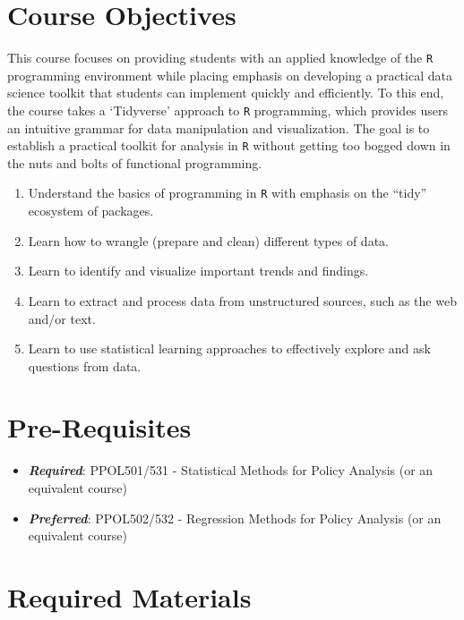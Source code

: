 \documentclass[
  12pt,
]{article}
\providecommand{\tightlist}{%
  \setlength{\itemsep}{0pt}\setlength{\parskip}{0pt}}
\begin{document}
\hypertarget{course-objectives}{%
\section{Course Objectives}\label{course-objectives}}

This course focuses on providing students with an applied knowledge of
the \texttt{R} programming environment while placing emphasis on
developing a practical data science toolkit that students can implement
quickly and efficiently. To this end, the course takes a `Tidyverse'
approach to \texttt{R} programming, which provides users an intuitive
grammar for data manipulation and visualization. The goal is to
establish a practical toolkit for analysis in \texttt{R} without getting
too bogged down in the nuts and bolts of functional programming.

\begin{enumerate}
\def\labelenumi{\arabic{enumi}.}
\item
  Understand the basics of programming in \texttt{R} with emphasis on
  the ``tidy'' ecosystem of packages.
\item
  Learn how to wrangle (prepare and clean) different types of data.
\item
  Learn to identify and visualize important trends and findings.
\item
  Learn to extract and process data from unstructured sources, such as
  the web and/or text.
\item
  Learn to use statistical learning approaches to effectively explore
  and ask questions from data.
\end{enumerate}

\hypertarget{pre-requisites}{%
\section{Pre-Requisites}\label{pre-requisites}}

\begin{itemize}
\tightlist
\item
  \textbf{\emph{Required}}: PPOL501/531 - Statistical Methods for Policy
  Analysis (or an equivalent course)
\item
  \textbf{\emph{Preferred}}: PPOL502/532 - Regression Methods for Policy
  Analysis (or an equivalent course)
\end{itemize}

\hypertarget{required-materials}{%
\section{Required Materials}\label{required-materials}}
\end{document}
